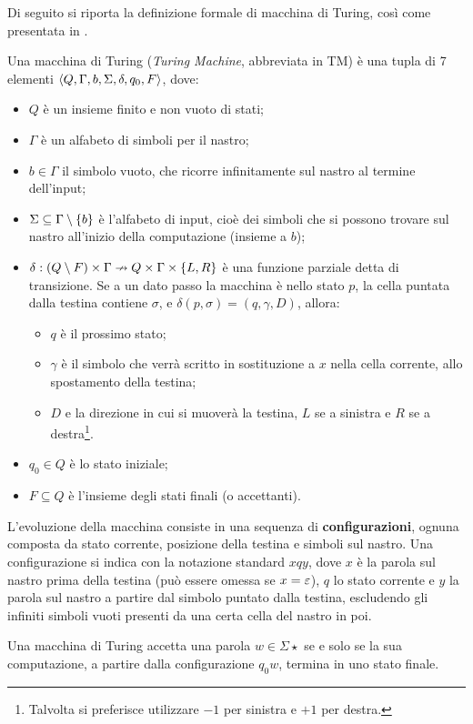 Di seguito si riporta la definizione formale di macchina di Turing, così come presentata in \cite{hopcroftullman79}.
\begin{defin}
	Una macchina di Turing (\emph{Turing Machine}, abbreviata in TM) è una tupla di 7 elementi $\langle Q,\Gamma,b,\Sigma,\delta,q_0,F \rangle$, dove:
	\begin{itemize}
		\item $Q$ è un insieme finito e non vuoto di stati;
		\item $\Gamma$ è un alfabeto di simboli per il nastro;
		\item $b\in\Gamma$ il simbolo vuoto, che ricorre infinitamente sul nastro al termine dell'input;
		\item $\Sigma\subseteq\Gamma\setminus\left\{ b \right\}$ è l'alfabeto di input, cioè dei simboli che si possono trovare sul nastro all'inizio della computazione (insieme a $b$);
		\item $\delta:(Q\setminus F)\times\Gamma\nrightarrow Q\times\Gamma\times\left\{ L,R \right\}$ è una funzione parziale detta di transizione. Se a un dato passo la macchina è nello stato $p$, la cella puntata dalla testina contiene $\sigma$, e $\delta(p,\sigma)=(q,\gamma,D)$, allora:
			\begin{itemize}
				\item $q$ è il prossimo stato;
				\item $\gamma$ è il simbolo che verrà scritto in sostituzione a $x$ nella cella corrente, allo spostamento della testina;
				\item $D$ e la direzione in cui si muoverà la testina, $L$ se a sinistra e $R$ se a destra\footnote{Talvolta si preferisce utilizzare $-1$ per sinistra e $+1$ per destra.}.
			\end{itemize}
		\item $q_0\in Q$ è lo stato iniziale;
		\item $F\subseteq Q$ è l'insieme degli stati finali (o accettanti).
	\end{itemize}
	L'evoluzione della macchina consiste in una sequenza di \textbf{configurazioni}, ognuna composta da stato corrente, posizione della testina e simboli sul nastro. Una configurazione si indica con la notazione standard $xqy$, dove $x$ è la parola sul nastro prima della testina (può essere omessa se $x=\varepsilon$), $q$ lo stato corrente e $y$ la parola sul nastro a partire dal simbolo puntato dalla testina, escludendo gli infiniti simboli vuoti presenti da una certa cella del nastro in poi.

	Una macchina di Turing accetta una parola $w\in\Sigma\star$ se e solo se la sua computazione, a partire dalla configurazione $q_0w$, termina in uno stato finale.
\end{defin}

